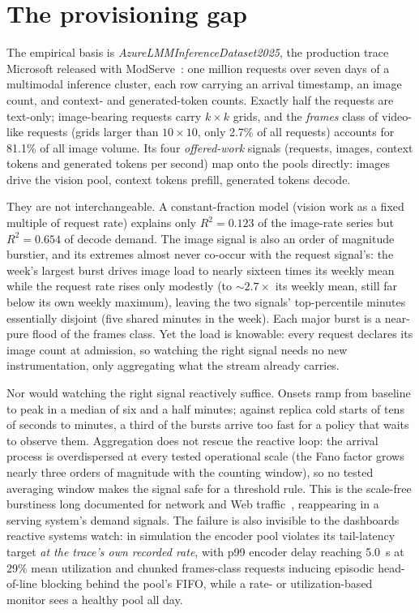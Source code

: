 \section{The provisioning gap}
\label{sec:intro-gap}

The empirical basis is \textit{AzureLMM\-Inference\-Dataset2025}, the
production trace Microsoft released with
ModServe~\cite{AzureLMM2025,Qiu2025ModServe}: one million requests over
seven days of a multimodal inference cluster, each row carrying an arrival
timestamp, an image count, and context- and generated-token counts. Exactly
half the requests are text-only; image-bearing requests carry $k\times k$
grids, and the \emph{frames} class of video-like requests (grids larger than
$10\times10$, only 2.7\% of all requests) accounts for 81.1\% of all image
volume. Its four \emph{offered-work} signals (requests, images, context
tokens and generated tokens per second) map onto the pools directly: images
drive the vision pool, context tokens prefill, generated tokens decode.

They are not interchangeable. A constant-fraction model (vision work as a
fixed multiple of request rate) explains only $R^2=\num{0.123}$ of the
image-rate series but $R^2=\num{0.654}$ of decode demand. The image signal
is also an order of magnitude burstier, and its extremes almost never
co-occur with the request signal's: the week's largest burst drives image
load to nearly sixteen times its weekly mean while the request rate rises
only modestly (to ${\sim}2.7\times$ its weekly mean, still far below its own
weekly maximum), leaving the two signals' top-percentile minutes essentially
disjoint (five shared minutes in the week). Each major burst is a near-pure
flood of the frames class. Yet the load is knowable: every request declares
its image count at admission, so watching the right signal needs no new
instrumentation, only aggregating what the stream already carries.

Nor would watching the right signal reactively suffice. Onsets ramp from
baseline to peak in a median of six and a half minutes; against replica cold
starts of tens of seconds to minutes, a third of the bursts arrive too fast
for a policy that waits to observe them. Aggregation does not rescue the
reactive loop: the arrival process is overdispersed at every tested
operational scale (the Fano factor grows nearly three orders of magnitude
with the counting window), so no tested averaging window makes the signal
safe for a threshold rule. This is the scale-free burstiness long documented
for network and Web traffic~\cite{Leland1994,Crovella1997}, reappearing in a
serving system's demand signals. The failure is also invisible to the
dashboards reactive systems watch: in simulation the encoder pool violates
its tail-latency target \emph{at the trace's own recorded rate}, with p99
encoder delay reaching \SI{5.0}{\second} at 29\% mean utilization and
chunked frames-class requests inducing episodic head-of-line blocking behind
the pool's FIFO, while a rate- or utilization-based monitor sees a healthy
pool all day.

